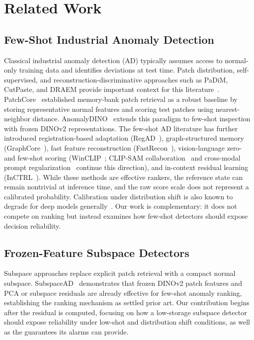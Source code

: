 \section{Related Work}\label{sec:related}
\subsection{Few-Shot Industrial Anomaly Detection}
Classical industrial anomaly detection (AD) typically assumes access to normal-only training data and identifies deviations at test time. Patch distribution, self-supervised, and reconstruction-discriminative approaches such as PaDiM, CutPaste, and DRAEM provide important context for this literature~\cite{padim2021,cutpaste2021,draem2021}. PatchCore~\cite{roth2022towards} established memory-bank patch retrieval as a robust baseline by storing representative normal features and scoring test patches using nearest-neighbor distance. AnomalyDINO~\cite{damm2025anomalydino} extends this paradigm to few-shot inspection with frozen DINOv2 representations. The few-shot AD literature has further introduced registration-based adaptation (RegAD~\cite{regad2022}), graph-structured memory (GraphCore~\cite{graphcore2023}), fast feature reconstruction (FastRecon~\cite{fastrecon2023}), vision-language zero- and few-shot scoring (WinCLIP~\cite{winclip2023}; CLIP-SAM collaboration~\cite{clipsam2025} and cross-modal prompt regularization~\cite{uniadprompt2026} continue this direction), and in-context residual learning (InCTRL~\cite{inctrl2024}). While these methods are effective rankers, the reference state can remain nontrivial at inference time, and the raw score scale does not represent a calibrated probability. Calibration under distribution shift is also known to degrade for deep models generally~\cite{ovadia2019trust}. Our work is complementary: it does not compete on ranking but instead examines how few-shot detectors should expose decision reliability.

\subsection{Frozen-Feature Subspace Detectors}
Subspace approaches replace explicit patch retrieval with a compact normal subspace. SubspaceAD~\cite{subspacead2026} demonstrates that frozen DINOv2 patch features and PCA or subspace residuals are already effective for few-shot anomaly ranking, establishing the ranking mechanism as settled prior art. Our contribution begins after the residual is computed, focusing on how a low-storage subspace detector should expose reliability under low-shot and distribution shift conditions, as well as the guarantees its alarms can provide.

